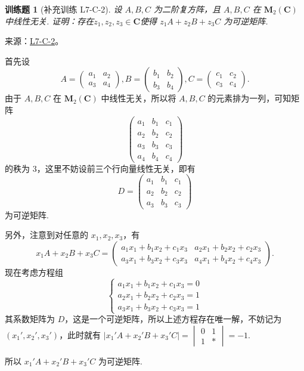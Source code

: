 \documentclass[UTF8,12pt,a4paper,fontset=fandol]{ctexart}
\newtheorem{exercise}{训练题}[section]
\begin{document}
\begin{exercise}[补充训练 L7-C-2]\label{prob:L7-C-2}
设 $A,B,C$ 为二阶复方阵，且 $A,B,C$ 在 $\mathbf{M}_2(\mathbf{C})$ 中线性无关. 证明：存在$z_1,z_2,z_3 \in \mathbf{C}$使得 $z_1A+z_2B+z_3C$ 为可逆矩阵.
\end{exercise}
\noindent 来源：\href{https://github.com/yhwu-is/Linear-Algebra-Left-Undone/blob/new/%E8%AE%B2%E4%B9%89/%E4%B8%93%E9%A2%98/7%20%E7%BA%BF%E6%80%A7%E6%98%A0%E5%B0%84%E7%9F%A9%E9%98%B5%E8%A1%A8%E7%A4%BA%E4%B8%8E%E7%9F%A9%E9%98%B5%E8%BF%90%E7%AE%97%E5%9F%BA%E7%A1%80.tex}{L7-C-2}。
\begin{solve}
首先设
            \[A=\begin{pmatrix}a_1 & a_2 \\ a_3 & a_4\end{pmatrix},B=\begin{pmatrix}b_1 & b_2 \\ b_3 & b_4\end{pmatrix},C=\begin{pmatrix}c_1 & c_2 \\ c_3 & c_4\end{pmatrix}.\]
            由于 $A,B,C$ 在 $\mathbf{M}_2(\mathbf{C})$ 中线性无关，所以将 $A,B,C$ 的元素排为一列，可知矩阵
            \[\begin{pmatrix}a_1 & b_1 & c_1 \\ a_2 & b_2 & c_2 \\ a_3 & b_3 & c_3 \\ a_4 & b_4 & c_4\end{pmatrix}\]
            的秩为 3，这里不妨设前三个行向量线性无关，即有
            \[D=\begin{pmatrix}a_1 & b_1 & c_1 \\ a_2 & b_2 & c_2 \\ a_3 & b_3 & c_3\end{pmatrix}\]
            为可逆矩阵.

            另外，注意到对任意的 $x_1,x_2,x_3$，有
            \[x_1A+x_2B+x_3C=\begin{pmatrix}a_1x_1+b_1x_2+c_1x_3 & a_2x_1+b_2x_2+c_2x_3 \\ a_3x_1+b_3x_2+c_3x_3 & a_4x_1+b_4x_2+c_4x_3\end{pmatrix}.\]
            现在考虑方程组
            \[\begin{cases}a_1x_1+b_1x_2+c_1x_3 = 0 \\ a_2x_1+b_2x_2+c_2x_3 = 1 \\ a_3x_1+b_3x_2+c_3x_3 = 1\end{cases}\]
            其系数矩阵为 $D$，这是一个可逆矩阵，所以上述方程存在唯一解，不妨记为 $(x_1',x_2',x_3')$，此时就有 $\lvert x_1'A+x_2'B+x_3'C \rvert = \begin{vmatrix}0 & 1 \\ 1 & \ast\end{vmatrix} = -1$.

            所以 $x_1'A+x_2'B+x_3'C$ 为可逆矩阵.
\end{solve}
\end{document}
